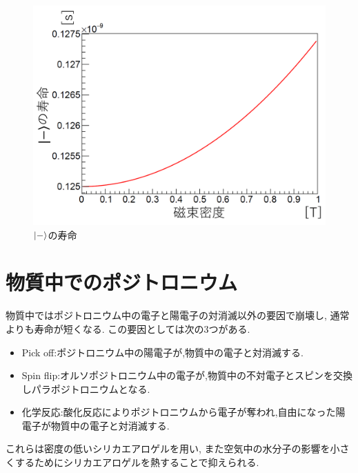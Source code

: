 \begin{figure}[H]
\centering
\includegraphics[keepaspectratio,scale=0.5]{fig/ybm/minuslife.pdf}
\caption{$\ket{-}$の寿命}
\label{fig:minuslife}
\end{figure}


\section{物質中でのポジトロニウム}

物質中ではポジトロニウム中の電子と陽電子の対消滅以外の要因で崩壊し,
通常よりも寿命が短くなる.
この要因としては次の3つがある.
\begin{itemize}
\item Pick off:ポジトロニウム中の陽電子が,物質中の電子と対消滅する.
\item Spin flip:オルソポジトロニウム中の電子が,物質中の不対電子とスピンを交換しパラポジトロニウムとなる.
\item 化学反応:酸化反応によりポジトロニウムから電子が奪われ,自由になった陽電子が物質中の電子と対消滅する.
\end{itemize}
これらは密度の低いシリカエアロゲルを用い,
また空気中の水分子の影響を小さくするためにシリカエアロゲルを熱することで抑えられる.
